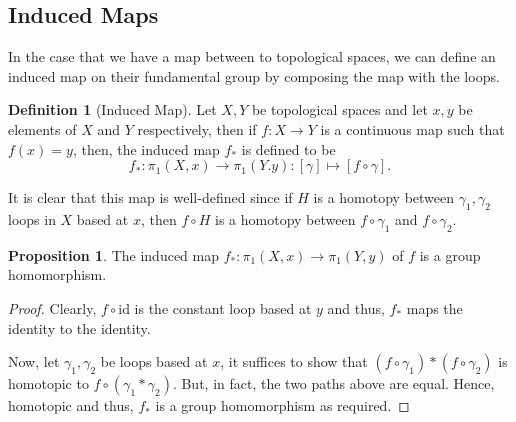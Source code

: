 \documentclass[]{article}
\theoremstyle{definition}
\theoremstyle{definition}
\newtheorem{definition}{Definition}[section]
\newtheorem{proposition}{Proposition}[section]
\begin{document}
\subsection{Induced Maps}

In the case that we have a map between to topological spaces, we can define an 
induced map on their fundamental group by composing the map with the loops.

\begin{definition}[Induced Map]
  Let \(X, Y\) be topological spaces and let \(x, y\) be elements of \(X\) and \(Y\) respectively,
  then if \(f : X \to Y\) is a continuous map such that \(f(x) = y\), then, the induced map 
  \(f_*\) is defined to be 
  \[f_* : \pi_1(X, x) \to \pi_1(Y. y) : [\gamma] \mapsto [f \circ \gamma].\]
\end{definition}

It is clear that this map is well-defined since if \(H\) is a homotopy between 
\(\gamma_1, \gamma_2\) loops in \(X\) based at \(x\), then 
\(f \circ H\) is a homotopy between \(f \circ \gamma_1\) and \(f \circ \gamma_2\).

\begin{proposition}
  The induced map \(f_* : \pi_1(X, x) \to \pi_1(Y, y)\) of \(f\) is a group homomorphism.
\end{proposition}
\begin{proof}
  Clearly, \(f \circ \text{id}\) is the constant loop based at \(y\) and thus, 
  \(f_*\) maps the identity to the identity. 

  Now, let \(\gamma_1, \gamma_2\) be loops based at \(x\), it suffices to show that 
  \((f \circ \gamma_1) * (f \circ \gamma_2)\) is homotopic to \(f \circ (\gamma_1 * \gamma_2)\).
  But, in fact, the two paths above are equal. Hence, homotopic and thus, \(f_*\) 
  is a group homomorphism as required.
\end{proof}
\end{document}
